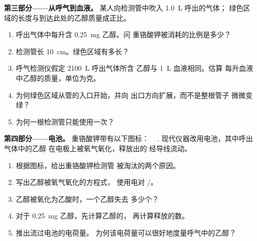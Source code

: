\begin{problem}
\medskip
\noindent\textbf{第三部分——从呼气到血液。}
某人向检测管中吹入 \qty{1.0}{L} 呼出的气体；
绿色区域的长度与到达此处的乙醇质量成正比。
\begin{enumerate}[resume]
  \item 呼出气体中每升含 \qty{0.25}{mg} 乙醇。问
        重铬酸钾被消耗的比例是多少？
  \item 检测管长 \qty{10}{cm}。绿色区域有多长？
  \item 呼气检测仪假定 \qty{2100}{L} 呼出气体所含
        乙醇与 \qty{1}{L} 血液相同。估算
        每升血液中乙醇的质量，单位为克。
  \item 为何绿色区域从管的入口开始，并向
        出口方向扩展，而不是整根管子
        微微变绿？
  \item 为何一根检测管只能使用一次？
\end{enumerate}

\medskip
\noindent\textbf{第四部分——电池。}
重铬酸钾带有以下图标：
\,\,\,\,\,.
现代仪器改用电池，其中呼出气体中的乙醇
在电极上被氧气氧化，释放出的
经导线流动。
\begin{enumerate}[resume]
  \item 根据图标，给出重铬酸钾检测管
        被淘汰的两个原因。
  \item 写出乙醇被氧气氧化的方程式，
        使用电对 /。
  \item 乙醇被氧化为乙酸时，一个乙醇失去
        多少个？
  \item 对于 \qty{0.25}{mg} 乙醇，先计算乙醇的，
        再计算释放的数。
  \item 推出流过电池的电荷量。
        为何该电荷量可以很好地度量呼气中的乙醇？
\end{enumerate}
\end{problem}
